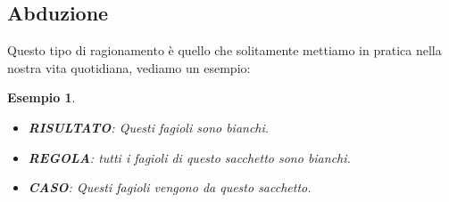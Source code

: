 \documentclass[../main.tex, class=letterpaper]{subfiles}
\newtheorem{exmp}{Esempio}[section]
\theoremstyle{definition}
\begin{document}
\subsection{Abduzione}
Questo tipo di ragionamento è quello che solitamente mettiamo in pratica nella nostra vita quotidiana, vediamo un esempio:
\begin{exmp}
        \begin{itemize}
                \item \textbf{RISULTATO}: Questi fagioli sono bianchi. 
                \item\textbf{REGOLA}: tutti i fagioli di questo sacchetto sono bianchi.
                \item\textbf{CASO}: Questi fagioli vengono da questo sacchetto.
        \end{itemize}
\end{exmp}
\end{document}
